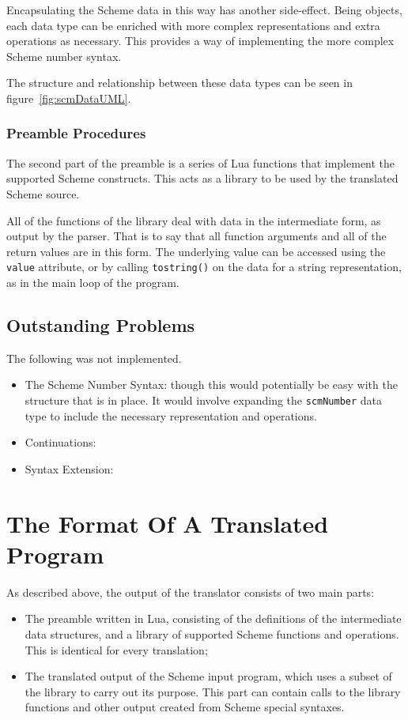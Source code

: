 Encapsulating the Scheme data in this way has another side-effect. Being
objects, each data type can be enriched with more complex representations and
extra operations as necessary. This provides a way of implementing the more
complex Scheme number syntax.

The structure and relationship between these data types
can be seen in figure~\ref{fig:scmDataUML}.

\subsubsection{Preamble Procedures}

The second part of the preamble is a series of Lua functions that implement the
supported Scheme constructs. This acts as a library to be used by the
translated Scheme source.

All of the functions of the library deal with data in the intermediate form, as
output by the parser. That is to say that all function arguments and all of the
return values are in this form. The underlying value can be accessed using the
\texttt{value} attribute, or by calling \texttt{tostring()} on the data for a
string representation, as in the main loop of the program.

\subsection{Outstanding Problems}

The following was not implemented.
\begin{itemize}
\item The Scheme Number Syntax: though this would potentially be easy with the
structure that is in place. It would involve expanding the \texttt{scmNumber}
data type to include the necessary representation and operations.
\item Continuations: 
\item Syntax Extension:
\end{itemize}

\section{The Format Of A Translated Program}

As described above, the output of the translator consists of two main parts:
\begin{itemize}
\item The preamble written in Lua, consisting of the definitions of the
intermediate data structures, and a library of supported Scheme functions and
operations. This is identical for every translation;
\item The translated output of the Scheme input program, which uses a subset
of the library to carry out its purpose. This part can contain calls to the
library functions and other output created from Scheme special syntaxes.
\end{itemize}

